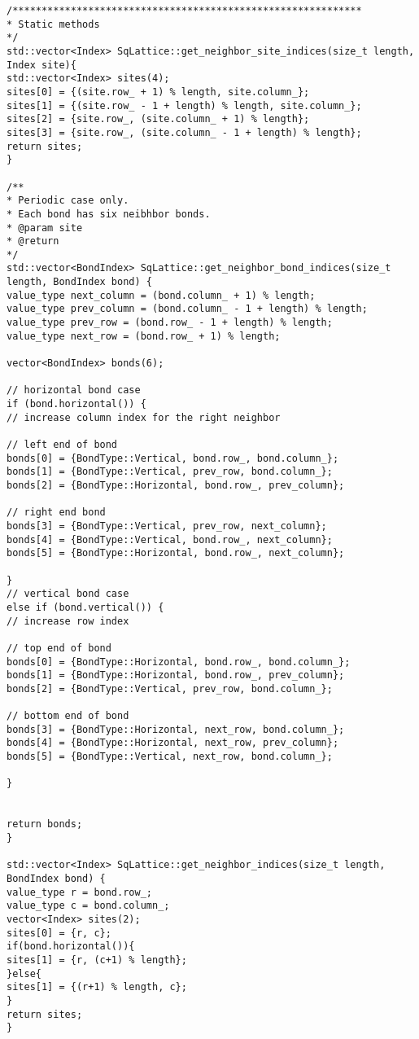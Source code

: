 \begin{lstlisting}[style=CStyle]
/************************************************************
* Static methods
*/
std::vector<Index> SqLattice::get_neighbor_site_indices(size_t length, Index site){
std::vector<Index> sites(4);
sites[0] = {(site.row_ + 1) % length, site.column_};
sites[1] = {(site.row_ - 1 + length) % length, site.column_};
sites[2] = {site.row_, (site.column_ + 1) % length};
sites[3] = {site.row_, (site.column_ - 1 + length) % length};
return sites;
}

/**
* Periodic case only.
* Each bond has six neibhbor bonds.
* @param site
* @return
*/
std::vector<BondIndex> SqLattice::get_neighbor_bond_indices(size_t length, BondIndex bond) {
value_type next_column = (bond.column_ + 1) % length;
value_type prev_column = (bond.column_ - 1 + length) % length;
value_type prev_row = (bond.row_ - 1 + length) % length;
value_type next_row = (bond.row_ + 1) % length;

vector<BondIndex> bonds(6);

// horizontal bond case
if (bond.horizontal()) {
// increase column index for the right neighbor

// left end of bond
bonds[0] = {BondType::Vertical, bond.row_, bond.column_};
bonds[1] = {BondType::Vertical, prev_row, bond.column_};
bonds[2] = {BondType::Horizontal, bond.row_, prev_column};

// right end bond
bonds[3] = {BondType::Vertical, prev_row, next_column};
bonds[4] = {BondType::Vertical, bond.row_, next_column};
bonds[5] = {BondType::Horizontal, bond.row_, next_column};

}
// vertical bond case
else if (bond.vertical()) {
// increase row index

// top end of bond
bonds[0] = {BondType::Horizontal, bond.row_, bond.column_};
bonds[1] = {BondType::Horizontal, bond.row_, prev_column};
bonds[2] = {BondType::Vertical, prev_row, bond.column_};

// bottom end of bond
bonds[3] = {BondType::Horizontal, next_row, bond.column_};
bonds[4] = {BondType::Horizontal, next_row, prev_column};
bonds[5] = {BondType::Vertical, next_row, bond.column_};

}


return bonds;
}

std::vector<Index> SqLattice::get_neighbor_indices(size_t length, BondIndex bond) {
value_type r = bond.row_;
value_type c = bond.column_;
vector<Index> sites(2);
sites[0] = {r, c};
if(bond.horizontal()){
sites[1] = {r, (c+1) % length};
}else{
sites[1] = {(r+1) % length, c};
}
return sites;
}

\end{lstlisting}

